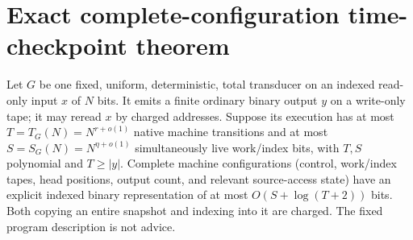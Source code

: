 \documentclass[11pt]{article}
\begin{document}
\section{Exact complete-configuration time-checkpoint theorem}
Let $G$ be one fixed, uniform, deterministic, total transducer on
an indexed read-only input $x$ of $N$ bits. It emits a finite ordinary
binary output $y$ on a write-only tape; it may reread $x$ by charged
addresses. Suppose its execution has at most
$T=T_G(N)=N^{r+o(1)}$ native machine transitions and at most
$S=S_G(N)=N^{\eta+o(1)}$ simultaneously live work/index bits,
with $T,S$ polynomial and $T\ge |y|$.
Complete machine configurations (control, work/index tapes, head
positions, output count, and relevant source-access state)
have an explicit indexed binary representation of at most
$O(S+\log(T+2))$ bits. Both copying an entire snapshot and
indexing into it are charged. The fixed program description is not advice.
\end{document}
